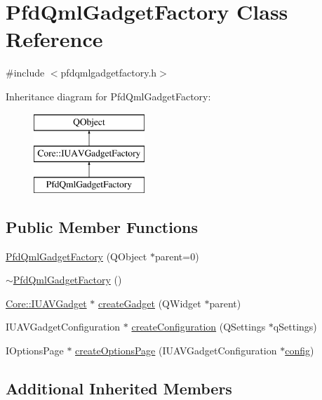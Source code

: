 \hypertarget{class_pfd_qml_gadget_factory}{\section{Pfd\-Qml\-Gadget\-Factory Class Reference}
\label{class_pfd_qml_gadget_factory}
}


{\ttfamily \#include $<$pfdqmlgadgetfactory.\-h$>$}

Inheritance diagram for Pfd\-Qml\-Gadget\-Factory\-:\begin{figure}[H]
\begin{center}
\leavevmode
\includegraphics[height=3.000000cm]{class_pfd_qml_gadget_factory}
\end{center}
\end{figure}
\subsection*{Public Member Functions}
\begin{DoxyCompactItemize}
\item 
\hyperlink{class_pfd_qml_gadget_factory_a6f9075efdc851baee7311c7033b31e30}{Pfd\-Qml\-Gadget\-Factory} (Q\-Object $\ast$parent=0)
\item 
\hyperlink{class_pfd_qml_gadget_factory_a8fd3534e971a8d3744837e72bc1bd93c}{$\sim$\-Pfd\-Qml\-Gadget\-Factory} ()
\item 
\hyperlink{class_core_1_1_i_u_a_v_gadget}{Core\-::\-I\-U\-A\-V\-Gadget} $\ast$ \hyperlink{class_pfd_qml_gadget_factory_a1c93695c0b81feb818a804d847d2ed6d}{create\-Gadget} (Q\-Widget $\ast$parent)
\item 
I\-U\-A\-V\-Gadget\-Configuration $\ast$ \hyperlink{class_pfd_qml_gadget_factory_a6dcb32fb151bd18d5f643b991f10d358}{create\-Configuration} (Q\-Settings $\ast$q\-Settings)
\item 
I\-Options\-Page $\ast$ \hyperlink{class_pfd_qml_gadget_factory_adb0a3b170a57ece58a95bf91998ef8eb}{create\-Options\-Page} (I\-U\-A\-V\-Gadget\-Configuration $\ast$\hyperlink{deflate_8c_a4473b5227787415097004fd39f55185e}{config})
\end{DoxyCompactItemize}
\subsection*{Additional Inherited Members}


